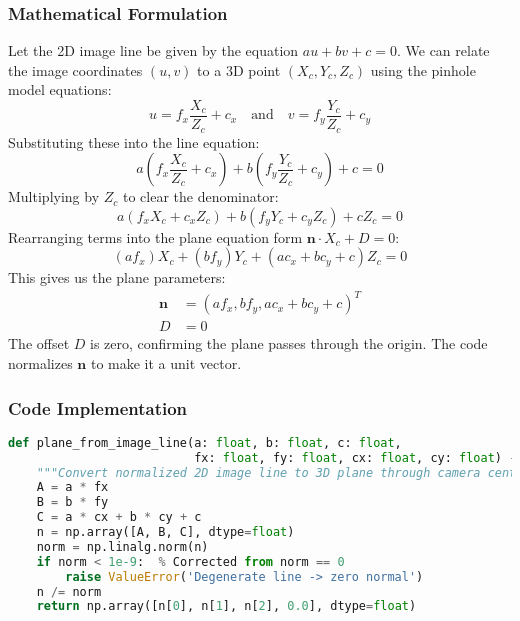 \documentclass{article}
\begin{document}
\subsubsection{Mathematical Formulation}
Let the 2D image line be given by the equation $a u + b v + c = 0$. We can relate the image coordinates $(u,v)$ to a 3D point $(X_c, Y_c, Z_c)$ using the pinhole model equations:
\begin{equation}
u = f_x \frac{X_c}{Z_c} + c_x \quad \text{and} \quad v = f_y \frac{Y_c}{Z_c} + c_y
\end{equation}
Substituting these into the line equation:
\begin{equation}
a \left( f_x \frac{X_c}{Z_c} + c_x \right) + b \left( f_y \frac{Y_c}{Z_c} + c_y \right) + c = 0
\end{equation}
Multiplying by $Z_c$ to clear the denominator:
\begin{equation}
a (f_x X_c + c_x Z_c) + b (f_y Y_c + c_y Z_c) + c Z_c = 0
\end{equation}
Rearranging terms into the plane equation form $\mathbf{n} \cdot X_c + D = 0$:
\begin{equation}
(a f_x) X_c + (b f_y) Y_c + (a c_x + b c_y + c) Z_c = 0
\end{equation}
This gives us the plane parameters:
\begin{align}
\mathbf{n} &= (a f_x, b f_y, a c_x + b c_y + c)^T \\
D &= 0
\end{align}
The offset $D$ is zero, confirming the plane passes through the origin. The code normalizes $\mathbf{n}$ to make it a unit vector.

\subsubsection{Code Implementation}
\begin{lstlisting}[language=Python]
def plane_from_image_line(a: float, b: float, c: float, 
                          fx: float, fy: float, cx: float, cy: float) -> np.ndarray:
    """Convert normalized 2D image line to 3D plane through camera center."""
    A = a * fx
    B = b * fy
    C = a * cx + b * cy + c
    n = np.array([A, B, C], dtype=float)
    norm = np.linalg.norm(n)
    if norm < 1e-9:  % Corrected from norm == 0
        raise ValueError('Degenerate line -> zero normal')
    n /= norm
    return np.array([n[0], n[1], n[2], 0.0], dtype=float)
\end{lstlisting}
\end{document}
